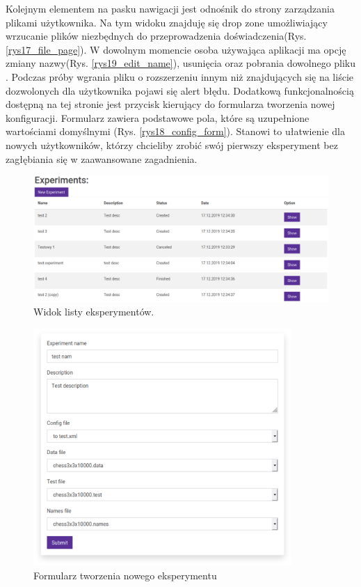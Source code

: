 Kolejnym elementem na pasku nawigacji jest odnośnik do strony zarządzania plikami użytkownika. Na tym widoku znajduję się drop zone umożliwiający wrzucanie plików niezbędnych do przeprowadzenia doświadczenia(Rys. \ref{rys17_file_page}). W dowolnym momencie osoba używająca aplikacji ma opcję zmiany nazwy(Rys. \ref{rys19_edit_name}), usunięcia oraz pobrania dowolnego pliku . Podczas próby wgrania pliku o rozszerzeniu innym niż znajdujących się na liście dozwolonych dla użytkownika pojawi się alert błędu. Dodatkową funkcjonalnością dostępną na tej stronie jest przycisk kierujący do formularza tworzenia nowej konfiguracji. Formularz zawiera podstawowe pola, które są uzupełnione wartościami domyślnymi (Rys. \ref{rys18_config_form}). Stanowi to ułatwienie dla nowych użytkowników, którzy chcieliby zrobić swój pierwszy eksperyment bez zagłębiania się w zaawansowane zagadnienia.
\begin{figure}[htb]
	\centering
	\includegraphics[width=15cm]{grafika/experiment_table.eps}
	\caption{Widok listy eksperymentów.}
	\label{rys10_experiment_table}
\end{figure}

\begin{figure}[htb]
	\centering
	\includegraphics[height=9cm]{grafika/experiment_form.eps}
	\caption{Formularz tworzenia nowego eksperymentu}
	\label{rys11_experiment_form}
\end{figure}



